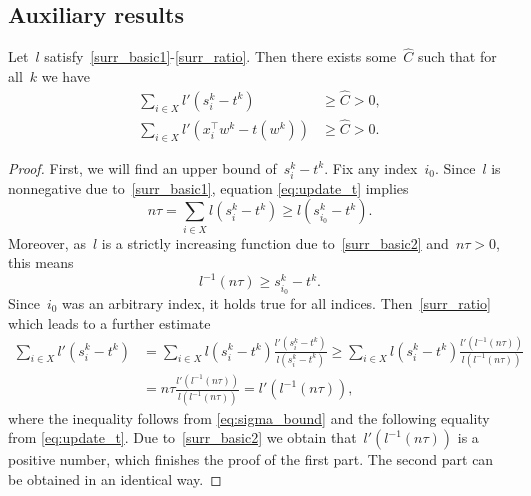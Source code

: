 \subsection{Auxiliary results}\label{app:sgd3}

\begin{lemma}\label{lemma:bound_zero}
  Let~$l$ satisfy~\ref{surr_basic1}-\ref{surr_ratio}. Then there exists some~$\hat C$ such that for all~$k$ we have
  \begin{equation*}
    \begin{aligned}
      \sum_{i\in X}l'(s_i^k-t^k) & \ge \hat C > 0, \\
      \sum_{i\in X}l'(x_i^\top w^k-t(w^k)) & \ge \hat C > 0.
    \end{aligned}
  \end{equation*}
\end{lemma}
\begin{proof}
  First, we will find an upper bound of~$s_i^k-t^k$. Fix any index~$i_0$. Since~$l$ is nonnegative due to~\ref{surr_basic1}, equation \eqref{eq:update_t} implies
  \begin{equation*}
    n\tau=\sum_{i\in X}l(s_i^k-t^k) \ge l(s_{i_0}^k-t^k).
  \end{equation*}
  Moreover, as~$l$ is a strictly increasing function due to~\ref{surr_basic2} and~$n\tau>0$, this means 
  \begin{equation}\label{eq:sigma_bound}
    l^{-1}(n\tau) \ge s_{i_0}^k-t^k.
  \end{equation}
  Since~$i_0$ was an arbitrary index, it holds true for all indices. Then~\ref{surr_ratio} which leads to a further estimate
  \begin{equation*}
    \begin{aligned}
    \sum_{i\in X}l'(s_i^k-t^k)
    & = \sum_{i\in X} l(s_i^k-t^k)\frac{l'(s_i^k-t^k)}{l(s_i^k-t^k)}
    \ge \sum_{i\in X} l(s_i^k-t^k)\frac{l'(l^{-1}(n\tau))}{l(l^{-1}(n\tau))} \\
    & = n\tau\frac{l'(l^{-1}(n\tau))}{l(l^{-1}(n\tau))} = l'(l^{-1}(n\tau)),
    \end{aligned}
  \end{equation*}
  where the inequality follows from \eqref{eq:sigma_bound} and the following equality from \eqref{eq:update_t}. Due to~\ref{surr_basic2} we obtain that~$l'(l^{-1}(n\tau))$ is a positive number, which finishes the proof of the first part. The second part can be obtained in an identical way.
\end{proof}

